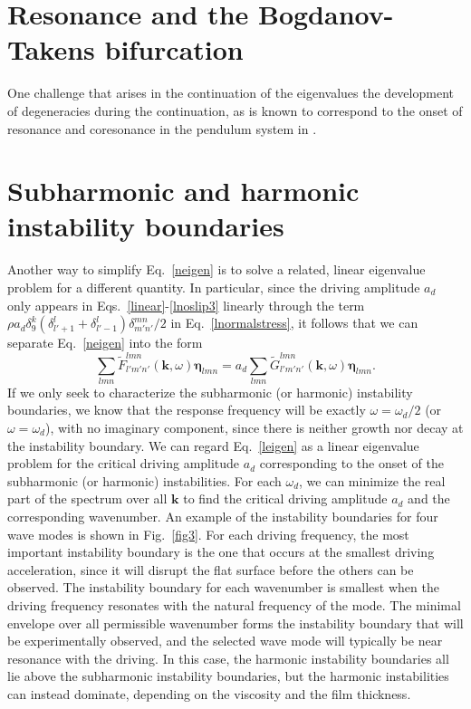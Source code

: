\documentclass[aps,pre,amsmath,amssymb,floatfix,onecolumn,notitlepage,10pt]{revtex4-1}
\begin{document}
\section{Resonance and the Bogdanov-Takens bifurcation}
One challenge that arises in the continuation of the eigenvalues the development of degeneracies during the continuation, as is known to correspond to the onset of resonance and coresonance in the pendulum system in \cite{2021_Nicolaou_2}. 

\section{Subharmonic and harmonic instability boundaries}
Another way to simplify Eq.~\eqref{neigen} is to solve a related, linear eigenvalue problem for a different quantity. In particular, since the driving amplitude $a_d$ only appears in Eqs.~\eqref{linear}-\eqref{lnoslip3} linearly through the term $\rho a_d\delta_9^k(\delta_{l'+1}^l+\delta_{l'-1}^l)\delta_{m'n'}^{mn}/2$ in Eq.~\eqref{lnormalstress}, it follows that we can separate Eq.~\eqref{neigen} into the form
\begin{equation}
\sum_{lmn} \tilde{F}^{lmn}_{l'm'n'}(\mathbf{k},\omega) \bm{\eta}_{lmn} = a_d \sum_{lmn}  \tilde{G}^{lmn}_{l'm'n'}(\mathbf{k},\omega)\bm{\eta}_{lmn}. \label{leigen}
\end{equation}
If we only seek to characterize the subharmonic (or harmonic) instability boundaries, we know that the response frequency will be exactly $\omega  = \omega_d/2$ (or $\omega  = \omega_d$), with no imaginary component, since there is neither growth nor decay at the instability boundary. We can regard Eq.~\eqref{leigen} as a linear eigenvalue problem for the critical driving amplitude $a_d$ corresponding to the onset of the subharmonic (or harmonic) instabilities. For each $\omega_d$, we can minimize the real part of the spectrum over all $\mathbf{k}$ to find the critical driving amplitude $a_d$ and the corresponding wavenumber. An example of the instability boundaries for four wave modes is shown in Fig.~\ref{fig3}. For each driving frequency, the most important instability boundary is the one that occurs at the smallest driving acceleration, since it will disrupt the flat surface before the others can be observed.  The instability boundary for each wavenumber is smallest when the driving frequency resonates with the natural frequency of the mode. The minimal envelope over all permissible wavenumber forms the instability boundary that will be experimentally observed, and the selected wave mode will typically be near resonance with the driving. In this case, the harmonic instability boundaries all lie above the subharmonic instability boundaries, but the harmonic instabilities can instead dominate, depending on the viscosity and the film thickness. 
\end{document}

